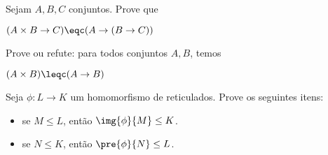 \begin{exercise}
%

Sejam $A, B, C$ conjuntos. Prove que \\ \centerline {$(A \times B \to C) \eqc (A \to (B \to C))$}

\end{exercise}

\begin{exercise}
%

Prove ou refute: para todos conjuntos $A, B$, temos \\ \centerline {$(A \times B) \leqc (A \to B)$}

\end{exercise}

\begin{exercise}
%

Seja $\phi : L \to K$ um homomorfismo de reticulados. 
Prove os seguintes itens:
\begin{itemize}
	\item se $M \leq L$, então $\img{\phi}{M} \leq K$.
	\item se $N \leq K$, então $\pre{\phi}{N} \leq L$.
\end{itemize}

\end{exercise}

